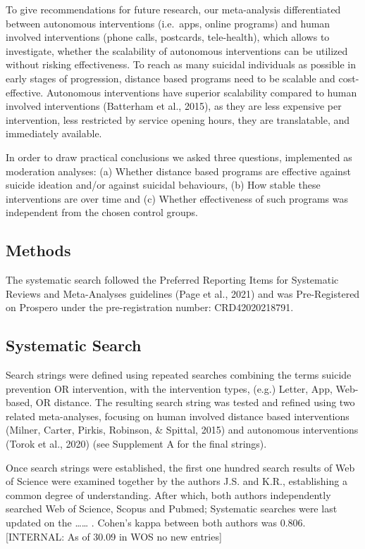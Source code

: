 \documentclass[
  english,
  man]{apa6}
\begin{document}
To give recommendations for future research, our meta-analysis differentiated between autonomous interventions (i.e.~apps, online programs) and human involved interventions (phone calls, postcards, tele-health), which allows to investigate, whether the scalability of autonomous interventions can be utilized without risking effectiveness. To reach as many suicidal individuals as possible in early stages of progression, distance based programs need to be scalable and cost-effective. Autonomous interventions have superior scalability compared to human involved interventions (Batterham et al., 2015), as they are less expensive per intervention, less restricted by service opening hours, they are translatable, and immediately available.

In order to draw practical conclusions we asked three questions, implemented as moderation analyses: (a) Whether distance based programs are effective against suicide ideation and/or against suicidal behaviours, (b) How stable these interventions are over time and (c) Whether effectiveness of such programs was independent from the chosen control groups.

\hypertarget{methods}{%
\subsection{Methods}\label{methods}}

The systematic search followed the Preferred Reporting Items for Systematic Reviews and Meta-Analyses guidelines (Page et al., 2021) and was Pre-Registered on Prospero under the pre-registration number: CRD42020218791.

\hypertarget{systematic-search}{%
\subsection{Systematic Search}\label{systematic-search}}

Search strings were defined using repeated searches combining the terms suicide prevention OR intervention, with the intervention types, (e.g.) Letter, App, Web-based, OR distance. The resulting search string was tested and refined using two related meta-analyses, focusing on human involved distance based interventions (Milner, Carter, Pirkis, Robinson, \& Spittal, 2015) and autonomous interventions (Torok et al., 2020) (see Supplement A for the final strings).

Once search strings were established, the first one hundred search results of Web of Science were examined together by the authors J.S. and K.R., establishing a common degree of understanding. After which, both authors independently searched Web of Science, Scopus and Pubmed; Systematic searches were last updated on the \ldots\ldots{} . Cohen's kappa between both authors was 0.806. {[}INTERNAL: As of 30.09 in WOS no new entries{]}
\end{document}

